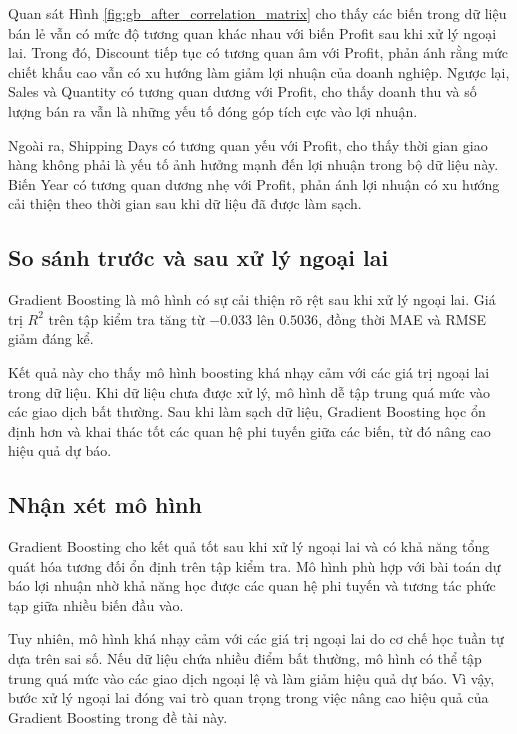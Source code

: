 Quan sát Hình \ref{fig:gb_after_correlation_matrix} cho thấy các biến trong dữ liệu bán lẻ vẫn có mức độ tương quan khác nhau với biến Profit sau khi xử lý ngoại lai. Trong đó, Discount tiếp tục có tương quan âm với Profit, phản ánh rằng mức chiết khấu cao vẫn có xu hướng làm giảm lợi nhuận của doanh nghiệp. Ngược lại, Sales và Quantity có tương quan dương với Profit, cho thấy doanh thu và số lượng bán ra vẫn là những yếu tố đóng góp tích cực vào lợi nhuận.

Ngoài ra, Shipping Days có tương quan yếu với Profit, cho thấy thời gian giao hàng không phải là yếu tố ảnh hưởng mạnh đến lợi nhuận trong bộ dữ liệu này. Biến Year có tương quan dương nhẹ với Profit, phản ánh lợi nhuận có xu hướng cải thiện theo thời gian sau khi dữ liệu đã được làm sạch.


\subsection*{\thesubsection\quad So sánh trước và sau xử lý ngoại lai}

Gradient Boosting là mô hình có sự cải thiện rõ rệt sau khi xử lý ngoại lai. Giá trị \(R^2\) trên tập kiểm tra tăng từ \(-0.033\) lên \(0.5036\), đồng thời MAE và RMSE giảm đáng kể.

Kết quả này cho thấy mô hình boosting khá nhạy cảm với các giá trị ngoại lai trong dữ liệu. Khi dữ liệu chưa được xử lý, mô hình dễ tập trung quá mức vào các giao dịch bất thường. Sau khi làm sạch dữ liệu, Gradient Boosting học ổn định hơn và khai thác tốt các quan hệ phi tuyến giữa các biến, từ đó nâng cao hiệu quả dự báo.

\subsection*{\thesubsection\quad Nhận xét mô hình}

Gradient Boosting cho kết quả tốt sau khi xử lý ngoại lai và có khả năng tổng quát hóa tương đối ổn định trên tập kiểm tra. Mô hình phù hợp với bài toán dự báo lợi nhuận nhờ khả năng học được các quan hệ phi tuyến và tương tác phức tạp giữa nhiều biến đầu vào.

Tuy nhiên, mô hình khá nhạy cảm với các giá trị ngoại lai do cơ chế học tuần tự dựa trên sai số. Nếu dữ liệu chứa nhiều điểm bất thường, mô hình có thể tập trung quá mức vào các giao dịch ngoại lệ và làm giảm hiệu quả dự báo. Vì vậy, bước xử lý ngoại lai đóng vai trò quan trọng trong việc nâng cao hiệu quả của Gradient Boosting trong đề tài này.

